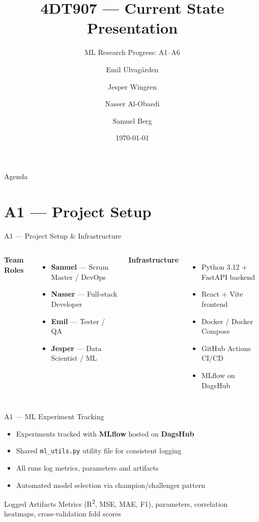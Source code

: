 \documentclass{beamer}
\title{4DT907 --- Current State Presentation}
\subtitle{ML Research Progress: A1--A6}
\author{Emil Ulvag\r{a}rden \and Jesper Wingren \and Nasser Al-Obaedi \and Samuel Berg}
\institute{4DT907 --- Project in Data Intensive Systems}
\date{\today}
\begin{document}
\begin{frame}\titlepage\end{frame}

\begin{frame}{Agenda}
    \tableofcontents
\end{frame}

\section{A1 --- Project Setup}

\begin{frame}{A1 --- Project Setup \& Infrastructure}
    \begin{columns}
        \textbf{Team Roles}
        \begin{itemize}
            \item \textbf{Samuel} --- Scrum Master / DevOps
            \item \textbf{Nasser} --- Full-stack Developer
            \item \textbf{Emil} --- Tester / QA
            \item \textbf{Jesper} --- Data Scientist / ML
        \end{itemize}

        \textbf{Infrastructure}
        \begin{itemize}
            \item Python 3.12 + FastAPI backend
            \item React + Vite frontend
            \item Docker / Docker Compose
            \item GitHub Actions CI/CD
            \item MLflow on DagsHub
        \end{itemize}
    \end{columns}
\end{frame}

\begin{frame}{A1 --- ML Experiment Tracking}
    \begin{itemize}
        \item Experiments tracked with \textbf{MLflow} hosted on \textbf{DagsHub}
        \item Shared \texttt{ml\_utils.py} utility file for consistent logging
        \item All runs log metrics, parameters and artifacts
        \item Automated model selection via champion/challenger pattern
    \end{itemize}
    \vspace{0.5em}
    \begin{block}{Logged Artifacts}
        Metrics (R\textsuperscript{2}, MSE, MAE, F1), parameters, correlation
        heatmaps, cross-validation fold scores
    \end{block}
\end{frame}
\end{document}
